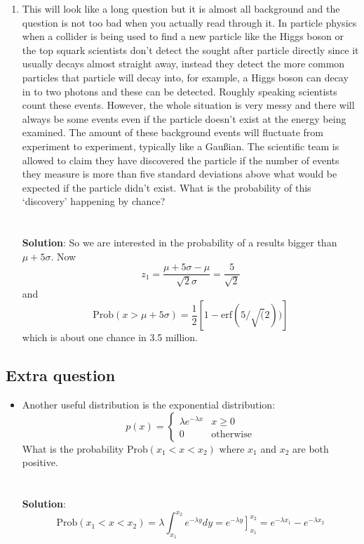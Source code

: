 \documentclass[11pt,a4paper]{scrartcl}
\begin{document}
\begin{enumerate}
\item This will look like a long question but it is almost all
  background and the question is not too bad when you actually read
  through it. In particle physics when a collider is being used to
  find a new particle like the Higgs boson or the top squark
  scientists don't detect the sought after particle directly since it
  usually decays almost straight away, instead they detect the more
  common particles that particle will decay into, for example, a Higgs
  boson can decay in to two photons and these can be detected. Roughly
  speaking scientists count these events. However, the whole situation
  is very messy and there will always be some events even if the
  particle doesn't exist at the energy being examined. The amount of
  these background events will fluctuate from experiment to
  experiment, typically like a Gau\ss{}ian. The scientific team is
  allowed to claim they have discovered the particle if the number of
  events they measure is more than five standard deviations above
  what would be expected if the particle didn't exist. What is the
  probability of this \lq{}discovery\rq{} happening by chance?
  \\ \\ \\ \textbf{Solution}: So we are interested in the probability of a results bigger than $\mu+5\sigma$. Now
\begin{equation}
z_1=\frac{\mu+5\sigma-\mu}{\sqrt{2}\sigma}=\frac{5}{\sqrt{2}}
\end{equation}
and
\begin{equation}
\mbox{Prob}(x>\mu+5\sigma)=\frac{1}{2}[1-\mbox{erf}(5/\sqrt(2))]
\end{equation}
which is about one chance in 3.5 million.

\end{enumerate}

\subsection*{Extra question}

\begin{itemize}
\item Another useful distribution is the exponential distribution:
$$
p(x)=\left\{\begin{array}{cc}\lambda e^{-\lambda x}& x\ge 0\\ 0&\mbox{otherwise}\end{array}\right.
$$
What is the probability $\mbox{Prob}(x_1 < x <x_2)$ where $x_1$ and $x_2$ are both positive.
  \\ \\ \\ \textbf{Solution}: 
\begin{equation}
\mbox{Prob}(x_1 < x <x_2)=\lambda \int_{x_1}^{x_2} e^{-\lambda y}dy=\left. e^{-\lambda y} \right]_{x_1}^{x_2}=e^{-\lambda x_1}-e^{-\lambda x_2}
\end{equation}
\end{itemize}
\end{document}
